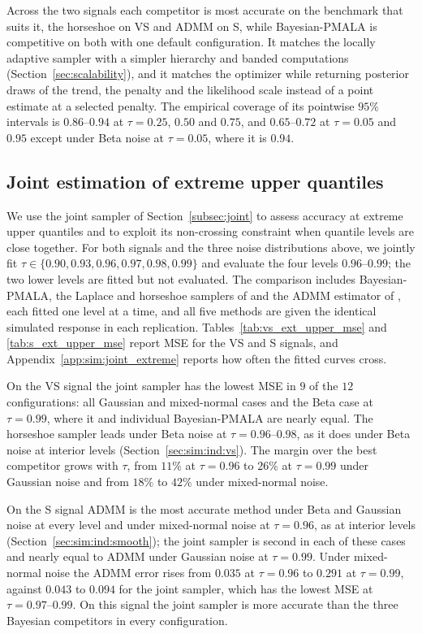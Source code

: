 Across the two signals each competitor is most accurate on the benchmark that suits it, the horseshoe on VS and ADMM on S, while Bayesian-PMALA is competitive on both with one default configuration. It matches the locally adaptive sampler with a simpler hierarchy and banded computations (Section~\ref{sec:scalability}), and it matches the optimizer while returning posterior draws of the trend, the penalty and the likelihood scale instead of a point estimate at a selected penalty. The empirical coverage of its pointwise $95\%$ intervals is $0.86$--$0.94$ at $\tau=0.25$, $0.50$ and $0.75$, and $0.65$--$0.72$ at $\tau=0.05$ and $0.95$ except under Beta noise at $\tau=0.05$, where it is $0.94$.

\subsection{Joint estimation of extreme upper quantiles}
\label{sec:sim:extreme}

We use the joint sampler of Section~\ref{subsec:joint} to assess accuracy at extreme upper quantiles and to exploit its non-crossing constraint when quantile levels are close together. For both signals and the three noise distributions above, we jointly fit $\tau\in\{0.90,0.93,0.96,0.97,0.98,0.99\}$ and evaluate the four levels $0.96$--$0.99$; the two lower levels are fitted but not evaluated. The comparison includes Bayesian-PMALA, the Laplace and horseshoe samplers of \citet{onizuka2024fast} and the ADMM estimator of \citet{brantley2020baseline}, each fitted one level at a time, and all five methods are given the identical simulated response in each replication. Tables~\ref{tab:vs_ext_upper_mse} and \ref{tab:s_ext_upper_mse} report MSE for the VS and S signals, and Appendix~\ref{app:sim:joint_extreme} reports how often the fitted curves cross.

On the VS signal the joint sampler has the lowest MSE in $9$ of the $12$ configurations: all Gaussian and mixed-normal cases and the Beta case at $\tau=0.99$, where it and individual Bayesian-PMALA are nearly equal. The horseshoe sampler leads under Beta noise at $\tau=0.96$--$0.98$, as it does under Beta noise at interior levels (Section~\ref{sec:sim:ind:vs}). The margin over the best competitor grows with $\tau$, from $11\%$ at $\tau=0.96$ to $26\%$ at $\tau=0.99$ under Gaussian noise and from $18\%$ to $42\%$ under mixed-normal noise.

On the S signal ADMM is the most accurate method under Beta and Gaussian noise at every level and under mixed-normal noise at $\tau=0.96$, as at interior levels (Section~\ref{sec:sim:ind:smooth}); the joint sampler is second in each of these cases and nearly equal to ADMM under Gaussian noise at $\tau=0.99$. Under mixed-normal noise the ADMM error rises from $0.035$ at $\tau=0.96$ to $0.291$ at $\tau=0.99$, against $0.043$ to $0.094$ for the joint sampler, which has the lowest MSE at $\tau=0.97$--$0.99$. On this signal the joint sampler is more accurate than the three Bayesian competitors in every configuration.

